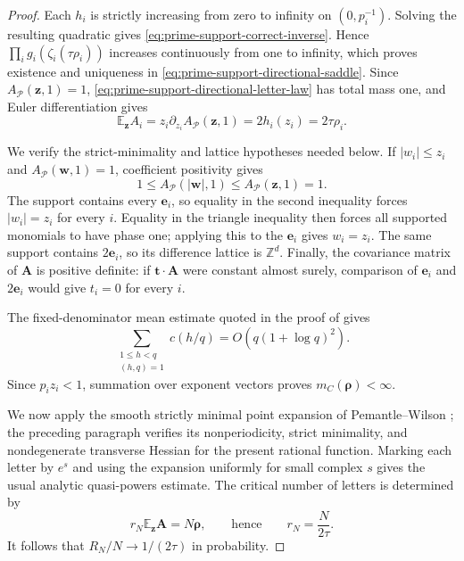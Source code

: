 \begin{proof}
Each \(h_i\) is strictly increasing from zero to infinity on
\((0,p_i^{-1})\).  Solving the resulting quadratic gives
\eqref{eq:prime-support-correct-inverse}.  Hence
\(\prod_i g_i(\zeta_i(\tau\rho_i))\) increases continuously from one to
infinity, which proves existence and uniqueness in
\eqref{eq:prime-support-directional-saddle}.  Since
\(A_{\mathcal P}(\mathbf z,1)=1\),
\eqref{eq:prime-support-directional-letter-law} has total mass one, and
Euler differentiation gives
\[
 \mathbb E_{\mathbf z}A_i
 =z_i\partial_{z_i}A_{\mathcal P}(\mathbf z,1)
 =2h_i(z_i)=2\tau\rho_i.
\]

We verify the strict-minimality and lattice hypotheses needed below.  If
\(|w_i|\le z_i\) and \(A_{\mathcal P}(\mathbf w,1)=1\), coefficient
positivity gives
\[
 1\le A_{\mathcal P}(|\mathbf w|,1)
 \le A_{\mathcal P}(\mathbf z,1)=1.
\]
The support contains every \(\mathbf e_i\), so equality in the second
inequality forces \(|w_i|=z_i\) for every \(i\).  Equality in the triangle
inequality then forces all supported monomials to have phase one; applying
this to the \(\mathbf e_i\) gives \(w_i=z_i\).  The same support contains
\(2\mathbf e_i\), so its difference lattice is \(\mathbb Z^d\).  Finally,
the covariance matrix of \(\mathbf A\) is positive definite: if
\(\mathbf t\cdot\mathbf A\) were constant almost surely, comparison of
\(\mathbf e_i\) and \(2\mathbf e_i\) would give \(t_i=0\) for every
\(i\).

The fixed-denominator mean estimate quoted in the proof of
 gives
\[
 \sum_{\substack{1\le h<q\\(h,q)=1}}c(h/q)
 =O(q(1+\log q)^2).
\]
Since \(p_i z_i<1\), summation over exponent vectors proves
\(m_C(\boldsymbol\rho)<\infty\).

We now apply the smooth strictly minimal point expansion of
Pemantle--Wilson \cite{PemantleWilson2002}; the preceding paragraph verifies
its nonperiodicity, strict minimality, and nondegenerate transverse Hessian
for the present rational function.  Marking each letter by \(e^s\) and
using the expansion uniformly for small complex \(s\) gives the usual
analytic quasi-powers estimate.  The critical number of letters is determined
by
\[
 r_N\mathbb E_{\mathbf z}\mathbf A=N\boldsymbol\rho,
 \qquad\text{hence}\qquad r_N=\frac{N}{2\tau}.
\]
It follows that \(R_N/N\to1/(2\tau)\) in probability.


\end{proof}
